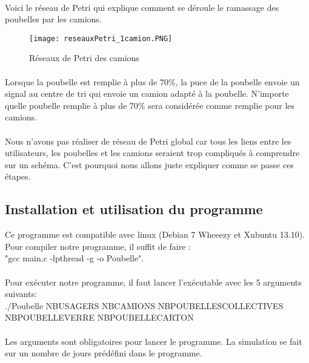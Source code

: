 \documentclass[12pt]{article}
\begin{document}
\paragraph{}Voici le réseau de Petri qui explique comment se déroule le ramassage des poubelles par les camions. 
\begin{figure}[h]
	\begin{center}
		\texttt{[image: reseauxPetri\_1camion.PNG]}
	\end{center}
	\caption{Réseaux de Petri des camions}
\label{Petri}
\end{figure}
\paragraph{}Lorsque la poubelle est remplie à plus de 70\%, la puce de la poubelle envoie un signal au centre de tri qui envoie un camion adapté à la poubelle. N'importe quelle poubelle remplie à plus de 70\% sera considérée comme remplie pour les camions.
\paragraph{}Nous n'avons pas réaliser de réseau de Petri global car tous les liens entre les utilisateurs, les poubelles et les camions seraient trop compliqués à comprendre sur un schéma. C'est pourquoi nous allons juste expliquer comme se passe ces étapes. 

\subsection{Installation et utilisation du programme}Ce programme est compatible avec linux (Debian 7 Wheeezy et Xubuntu 13.10). Pour compiler notre programme, il suffit de faire :\\ "gcc main.c -lpthread -g -o Poubelle".
\paragraph{}Pour exécuter notre programme, il faut lancer l'exécutable avec les 5 arguments suivants: \\./Poubelle NBUSAGERS NBCAMIONS NBPOUBELLESCOLLECTIVES NBPOUBELLEVERRE NBPOUBELLECARTON

\paragraph{}Les arguments sont obligatoires pour lancer le programme. La simulation se fait sur un nombre de jours prédéfini dans le programme.
\end{document}
